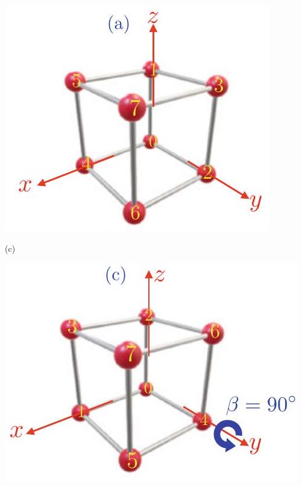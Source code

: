 \documentclass[10pt]{article}
\begin{document}
\begin{center}
\includegraphics[max width=\textwidth]{2023_04_20_41f1ceac5a31dc7d1b59g-120(4)}
\end{center}

(c)

\begin{center}
\includegraphics[max width=\textwidth]{2023_04_20_41f1ceac5a31dc7d1b59g-120(3)}
\end{center}
\end{document}
